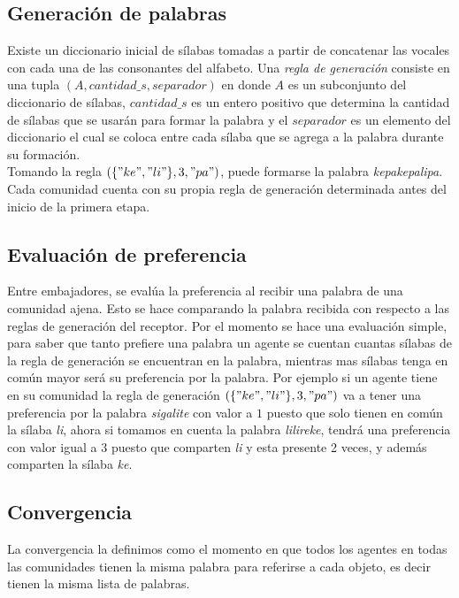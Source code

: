 \documentclass[runningheads]{llncs}
\begin{document}
\subsection{Generación de palabras}
Existe un diccionario inicial de sílabas tomadas a partir de concatenar las vocales con cada una de las consonantes del alfabeto. Una \textit{regla de generación} consiste en una tupla $(A,cantidad\_s,separador)$ en donde $A$ es un subconjunto del diccionario de sílabas, $cantidad\_s$ es un entero positivo que determina la cantidad de sílabas que se usarán para formar la palabra y el $separador$ es un elemento del diccionario el cual se coloca entre cada sílaba que se agrega a la palabra durante su formación.\\
Tomando la regla $(\{"ke", "li"\}, 3, "pa")$, puede formarse la palabra \textit{kepakepalipa}.\\
Cada comunidad cuenta con su propia regla de generación determinada antes del inicio de la primera etapa.
\subsection{Evaluación de preferencia}
Entre embajadores, se evalúa la preferencia al recibir una palabra de una comunidad ajena. Esto se hace comparando la palabra recibida con respecto a las reglas de generación del receptor. Por el momento se hace una evaluación simple, para saber que tanto prefiere una palabra un agente se cuentan cuantas sílabas de la regla de generación se encuentran en la palabra, mientras mas sílabas tenga en común mayor será su preferencia por la palabra.
Por ejemplo si un agente tiene en su comunidad la regla de generación $(\{"ke", "li"\}, 3, "pa")$ va a tener una preferencia por la palabra \textit{sigalite} con valor a $1$ puesto que solo tienen en común la sílaba \textit{li}, ahora si tomamos en cuenta la palabra \textit{lilireke}, tendrá una preferencia con valor igual a $3$ puesto que comparten \textit{li} y esta presente 2 veces, y además comparten la sílaba \textit{ke}.
\subsection{Convergencia}
La convergencia la definimos como el momento en que todos los agentes en todas las comunidades tienen la misma palabra para referirse a cada objeto, es decir tienen la misma lista de palabras.
\pagebreak
\end{document}
